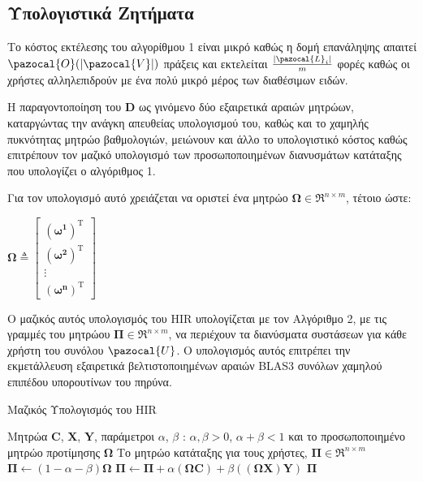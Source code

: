 \subsection{Υπολογιστικά Ζητήματα}
Το κόστος εκτέλεσης του αλγορίθμου 1 είναι μικρό καθώς η δομή επανάληψης απαιτεί $\pazocal{O}(|\pazocal{V}|)$ πράξεις και εκτελείται $\frac{|\pazocal{L}_i|}{m}$ φορές καθώς οι χρήστες αλληλεπιδρούν με ένα πολύ μικρό μέρος των διαθέσιμων ειδών.\par
Η παραγοντοποίηση του $\mathbf{D}$ ως γινόμενο δύο εξαιρετικά αραιών μητρώων, καταργώντας την ανάγκη απευθείας υπολογισμού του, καθώς και το χαμηλής πυκνότητας μητρώο βαθμολογιών, μειώνουν και άλλο το υπολογιστικό κόστος καθώς επιτρέπουν τον μαζικό υπολογισμό των προσωποποιημένων διανυσμάτων κατάταξης που υπολογίζει ο αλγόριθμος 1. \par
Για τον υπολογισμό αυτό χρειάζεται να οριστεί ένα μητρώο $\boldsymbol{\Omega}\in\Re^{n\times m}$, τέτοιο ώστε: 
\begin{center}
$\boldsymbol{\Omega} \triangleq \left[     
\begin{array}{c}
\boldsymbol{(\omega^1)}^\text{T} \\
\boldsymbol{(\omega^2)}^\text{T} \\
\vdots \\ 
\boldsymbol{(\omega^n)}^\text{T}
\end{array}\right]$ 
\end{center}\par
Ο μαζικός αυτός υπολογισμός του {\en HIR} υπολογίζεται με τον Αλγόριθμο 2, με τις γραμμές του μητρώου $\boldsymbol{\Pi}\in \Re^{n\times m}$, να περιέχουν τα διανύσματα συστάσεων για κάθε χρήστη του συνόλου $\pazocal{U}$. Ο υπολογισμός αυτός επιτρέπει την εκμετάλλευση εξαιρετικά βελτιστοποιημένων αραιών {\en BLAS3} συνόλων χαμηλού επιπέδου υπορουτίνων του πηρύνα.
\begin{algorithm}[ht]
  \caption{Μαζικός Υπολογισμός του {\en HIR}}\label{}
  \begin{algorithmic}[1]
    \Require Μητρώα $\mathbf{C}$, $\mathbf{X}$, $\mathbf{Y}$, παράμετροι $\alpha$, $\beta$ : $\alpha, \beta > 0$, $\alpha + \beta < 1$ και το προσωποποιημένο μητρώο προτίμησης $\boldsymbol{\Omega}$
    \Ensure Το μητρώο κατάταξης για τους χρήστες, $\boldsymbol{\Pi}\in \Re^{n\times m}$
    \medskip
    \State $\boldsymbol{\Pi} \gets (1-\alpha - \beta)\boldsymbol{\Omega}$
    \State $\boldsymbol{\Pi} \gets \boldsymbol{\Pi} + \alpha(\boldsymbol{\Omega}\mathbf{C}) + \beta((\boldsymbol{\Omega}\mathbf{X})\mathbf{Y})$
    \State \Return $ \boldsymbol{\Pi} $
  \end{algorithmic}
\end{algorithm}
